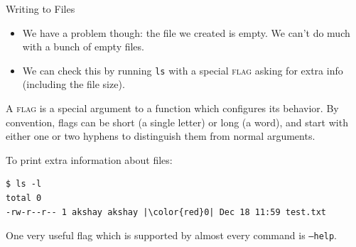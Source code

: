 \begin{frame}[fragile]{Writing to Files}
  \begin{itemize}
    \item
      We have a problem though: the file we created is empty.  We can't do much
      with a bunch of empty files.
    \item
      We can check this by running \texttt{ls} with a special \textsc{flag}
      asking for extra info (including the file size).
  \end{itemize}
   {
    \begin{definition}[flag]
      A \textsc{flag} is a special argument to a function which configures its
      behavior.  By convention, flags can be short (a single letter) or long (a
      word), and start with either one or two hyphens to distinguish them from
      normal arguments.
    \end{definition}
  }
  \pause
  \begin{example}[ls -l]
    To print extra information about files:
    \begin{verbatim}
$ ls -l
total 0
-rw-r--r-- 1 akshay akshay |\color{red}0| Dec 18 11:59 test.txt
    \end{verbatim}
  \end{example}
  \pause
  \alert<presentation>{One very useful flag which is supported by almost every
  command is \texttt{--help}.}%
\end{frame}

